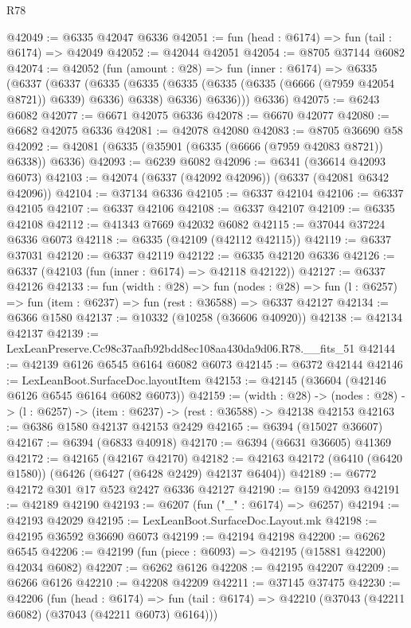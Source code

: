 \begin{lexlean}{R78}
\begin{coremodule}
@42049 := @6335 @42047 @6336
@42051 := fun (head : @6174) => fun (tail : @6174) => @42049
@42052 := @42044 @42051
@42054 := @8705 @37144 @6082
@42074 := @42052
    (fun (amount : @28) =>
    fun (inner : @6174) =>
    @6335
      (@6337
        (@6337
          (@6335
            (@6335 (@6335 (@6335 (@6335 (@6666 (@7959 @42054 @8721)) @6339) @6336) @6338) @6336)
            @6336)))
      @6336)
@42075 := @6243 @6082
@42077 := @6671 @42075 @6336
@42078 := @6670 @42077
@42080 := @6682 @42075 @6336
@42081 := @42078 @42080
@42083 := @8705 @36690 @58
@42092 := @42081 (@6335 (@35901 (@6335 (@6666 (@7959 @42083 @8721)) @6338)) @6336)
@42093 := @6239 @6082
@42096 := @6341 (@36614 @42093 @6073)
@42103 := @42074 (@6337 (@42092 @42096)) (@6337 (@42081 @6342 @42096))
@42104 := @37134 @6336
@42105 := @6337 @42104
@42106 := @6337 @42105
@42107 := @6337 @42106
@42108 := @6337 @42107
@42109 := @6335 @42108
@42112 := @41343 @7669 @42032 @6082
@42115 := @37044 @37224 @6336 @6073
@42118 := @6335 (@42109 (@42112 @42115))
@42119 := @6337 @37031
@42120 := @6337 @42119
@42122 := @6335 @42120 @6336
@42126 := @6337 (@42103 (fun (inner : @6174) => @42118 @42122))
@42127 := @6337 @42126
@42133 := fun (width : @28) =>
  fun (nodes : @28) => fun (l : @6257) => fun (item : @6237) => fun (rest : @36588) => @6337 @42127
@42134 := @6366 @1580
@42137 := @10332 (@10258 (@36606 @40920))
@42138 := @42134 @42137
@42139 := LexLeanPreserve.Cc98c37aafb92bdd8ec108aa430da9d06.R78.__fits_51
@42144 := @42139 @6126 @6545 @6164 @6082 @6073
@42145 := @6372 @42144
@42146 := LexLeanBoot.SurfaceDoc.layoutItem
@42153 := @42145 (@36604 (@42146 @6126 @6545 @6164 @6082 @6073))
@42159 := (width : @28) ->
  (nodes : @28) -> (l : @6257) -> (item : @6237) -> (rest : @36588) -> @42138 @42153
@42163 := @6386 @1580 @42137 @42153 @2429
@42165 := @6394 (@15027 @36607)
@42167 := @6394 (@6833 @40918)
@42170 := @6394 (@6631 @36605) @41369
@42172 := @42165 (@42167 @42170)
@42182 := @42163 @42172 (@6410 (@6420 @1580)) (@6426 (@6427 (@6428 @2429) @42137 @6404))
@42189 := @6772 @42172 @301 @17 @523 @2427 @6336 @42127
@42190 := @159 @42093
@42191 := @42189 @42190
@42193 := @6207 (fun ("_" : @6174) => @6257)
@42194 := @42193 @42029
@42195 := LexLeanBoot.SurfaceDoc.Layout.mk
@42198 := @42195 @36592 @36690 @6073
@42199 := @42194 @42198
@42200 := @6262 @6545
@42206 := @42199 (fun (piece : @6093) => @42195 (@15881 @42200) @42034 @6082)
@42207 := @6262 @6126
@42208 := @42195 @42207
@42209 := @6266 @6126
@42210 := @42208 @42209
@42211 := @37145 @37475
@42230 := @42206
    (fun (head : @6174) =>
    fun (tail : @6174) => @42210 (@37043 (@42211 @6082) (@37043 (@42211 @6073) @6164)))

\end{coremodule}
\end{lexlean}
